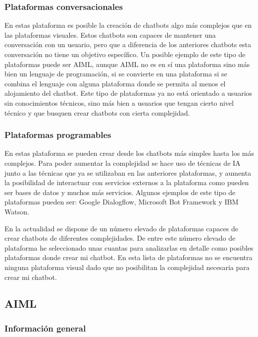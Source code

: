 \subsubsection*{Plataformas conversacionales}

En estas plataforma es posible la creación de chatbots algo más complejos que en las plataformas visuales. Estos chatbots son capaces de mantener una conversación con un usuario, pero que a diferencia de los anteriores chatbots esta conversación no tiene un objetivo específico. Un posible ejemplo de este tipo de plataformas puede ser AIML, aunque AIML no es en sí una plataforma sino más bien un lenguaje de programación, si se convierte en una plataforma si se combina el lenguaje con alguna plataforma donde se permita al menos el alojamiento del chatbot. Este tipo de plataformas ya no está orientado a usuarios sin conocimientos técnicos, sino más bien a usuarios que tengan cierto nivel técnico y que busquen crear chatbots con cierta complejidad. 

\subsubsection*{Plataformas programables}

En estas plataforma se pueden crear desde los chatbots más simples hasta los más complejos. Para poder aumentar la complejidad se hace uso de técnicas de IA junto a las técnicas que ya se utilizaban en las anteriores plataformas, y aumenta la posibilidad de interactuar con servicios externos a la plataforma como pueden ser bases de datos y muchos más servicios. Algunos ejemplos de este tipo de plataformas pueden ser: Google Dialogflow, Microsoft Bot Framework y IBM Watson. \newline\newline


En la actualidad se dispone de un número elevado de plataformas capaces de crear chatbots de diferentes complejidades. De entre este número elevado de plataforma he seleccionado unas cuantas para analizarlas en detalle como posibles plataformas donde crear mi chatbot. En esta lista de plataformas no se encuentra ninguna plataforma visual dado que no posibilitan la complejidad necesaria para crear mi chatbot.


\subsection{AIML}

\subsubsection*{Información general}

